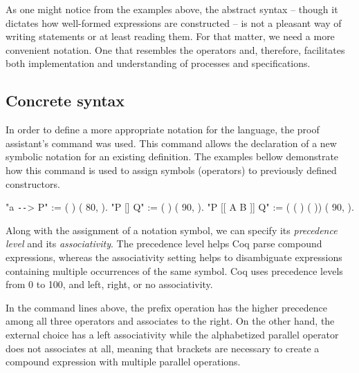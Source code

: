 As one might notice from the examples above, the abstract syntax -- though it dictates how well-formed expressions are constructed -- is not a pleasant way of writing statements or at least reading them. For that matter, we need a more convenient notation. One that resembles the \CSPM{} operators and, therefore, facilitates both implementation and understanding of \CSPcoq{} processes and specifications.

\subsection{Concrete syntax}

In order to define a more appropriate notation for the \CSPcoq{} language, the proof assistant's  command was used. This command allows the declaration of a new symbolic notation for an existing definition. The examples bellow demonstrate how this command is used to assign symbols (operators) to previously defined constructors.

\begin{coqdoccode}
	\coqdocnoindent
	 "a \texttt{-{}-}> P" := (  ) (  80,  ).\coqdoceol
	\coqdocnoindent
	 "P [] Q" := (  ) (  90,  ).\coqdoceol
	\coqdocnoindent
	 "P [[ A  B ]] Q" := (   ( ) ( )) (  90,  ).\coqdoceol
\end{coqdoccode}

Along with the assignment of a notation symbol, we can specify its \emph{precedence level} and its \emph{associativity}. The precedence level helps Coq parse compound expressions, whereas the associativity setting helps to disambiguate expressions containing multiple occurrences of the same symbol. Coq uses precedence levels from 0 to 100, and left, right, or no associativity.

In the command lines above, the prefix operation has the higher precedence among all three operators and associates to the right. On the other hand, the external choice has a left associativity while the alphabetized parallel operator does not associates at all, meaning that brackets are necessary to create a compound expression with multiple parallel operations.

